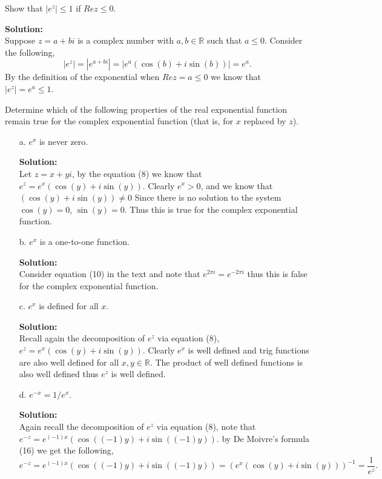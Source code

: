 \documentclass[12pt]{article}
\makeatletter
\theoremstyle{homework}
\newenvironment{exercise}[1]
{\def\@currentlabel{#1}\exercisecore}
{\endexercisecore}
\newcommand{\localhead}[1]{\par\smallskip\noindent\textbf{#1}\nobreak\\}%
\newcommand\solution{\localhead{Solution:}}
\newcommand{\Reals}{\ensuremath{\mathbb R}}
\let\RR\Reals
\makeatother
\begin{document}
\begin{exercise}{10} Show that $|e^z| \leq 1$ if $Re z \leq 0$.\\
    \solution Suppose $z = a + bi$ is a complex number with $a, b \in \RR$ such that $a \leq 0$. Consider the following, 
    \begin{equation*}
        |e^z| = |e^{a + bi}| = |e^a(\cos(b) + i \sin(b))| = e^a.  
    \end{equation*}
    By the definition of the exponential when $Re z = a \leq 0$ we know that $|e^z| = e^a \leq 1$.    
\end{exercise}
\vspace{.15in}



\begin{exercise}{11} Determine which of the following properties of the real exponential function remain 
    true for the complex exponential function (that is, for $x$ replaced by $z$).\\
    \begin{enumerate}
        \item[a.] $e^x$ is never zero.\\
        \solution  Let $z = x + yi$, by the equation (8) we know that $e^z = e^x(\cos(y) + i\sin(y))$. Clearly 
        $e^x > 0$, and we know that $(\cos(y) + i\sin(y)) \neq 0$ Since there is no solution to the system $\cos(y) = 0$, $\sin(y) = 0$. 
        Thus this is true for the complex exponential function. 
        
        \item[b.] $e^x$ is a one-to-one function.\\
        \solution  Consider equation (10) in the text and note that $e^{2\pi i} = e^{-2\pi i}$ thus this is false for the complex exponential function.
        
        \item[c.] $e^x$ is defined for all $x$.\\
        \solution  Recall again the decomposition of $e^z$ via equation (8), $e^z = e^x(\cos(y) + i\sin(y))$. Clearly $e^x$ is well defined 
        and trig functions are also well defined for all $x,y \in \RR$. The product of well defined functions is also well defined thus $e^z$ is well defined. 

        \item[d.] $e^{-x} = 1/e^x$.\\   
        \solution  Again recall the decomposition of $e^z$ via equation (8), note that $e^{-z} = e^{(-1)x}(\cos((-1)y) + i\sin((-1)y))$. by De Moivre's formula (16) we get 
        the following, 
        \begin{equation*}
            e^{-z} = e^{(-1)x}(\cos((-1)y) + i\sin((-1)y)) = \left(e^{x}(\cos(y) + i\sin(y))\right)^{-1} = \dfrac{1}{e^z}. 
        \end{equation*}
    \end{enumerate}
\end{exercise}
\vspace{.15in}
\end{document}
